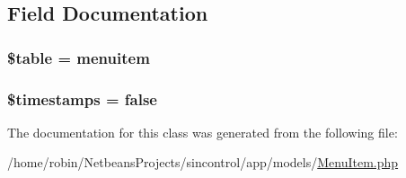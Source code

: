 \subsection{Field Documentation}
\hypertarget{class_menu_item_ae8876a14058f368335baccf35af4a22b}{}
\subsubsection[{\$table}]{\setlength{\rightskip}{0pt plus 5cm}\$table = \textquotesingle{}menuitem\textquotesingle{}\hspace{0.3cm}{\ttfamily [protected]}}\label{class_menu_item_ae8876a14058f368335baccf35af4a22b}
\hypertarget{class_menu_item_a51267c24c8fae742ed8f9be0ba6085ee}{}
\subsubsection[{\$timestamps}]{\setlength{\rightskip}{0pt plus 5cm}\$timestamps = false}\label{class_menu_item_a51267c24c8fae742ed8f9be0ba6085ee}


The documentation for this class was generated from the following file\+:\begin{DoxyCompactItemize}
\item 
/home/robin/\+Netbeans\+Projects/sincontrol/app/models/\hyperlink{_menu_item_8php}{Menu\+Item.\+php}\end{DoxyCompactItemize}
